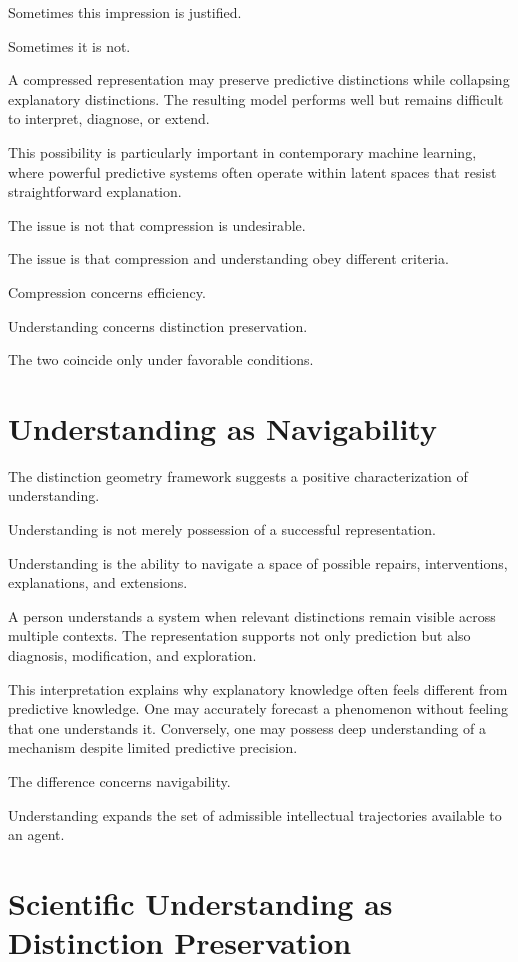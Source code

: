 \documentclass[11pt,oneside,openany]{book}
\begin{document}
Sometimes this impression is justified.

Sometimes it is not.

A compressed representation may preserve predictive distinctions while collapsing explanatory distinctions. The resulting model performs well but remains difficult to interpret, diagnose, or extend.

This possibility is particularly important in contemporary machine learning, where powerful predictive systems often operate within latent spaces that resist straightforward explanation.

The issue is not that compression is undesirable.

The issue is that compression and understanding obey different criteria.

Compression concerns efficiency.

Understanding concerns distinction preservation.

The two coincide only under favorable conditions.

\section{Understanding as Navigability}

The distinction geometry framework suggests a positive characterization of understanding.

Understanding is not merely possession of a successful representation.

Understanding is the ability to navigate a space of possible repairs, interventions, explanations, and extensions.

A person understands a system when relevant distinctions remain visible across multiple contexts. The representation supports not only prediction but also diagnosis, modification, and exploration.

This interpretation explains why explanatory knowledge often feels different from predictive knowledge. One may accurately forecast a phenomenon without feeling that one understands it. Conversely, one may possess deep understanding of a mechanism despite limited predictive precision.

The difference concerns navigability.

Understanding expands the set of admissible intellectual trajectories available to an agent.

\section{Scientific Understanding as Distinction Preservation}
\end{document}

